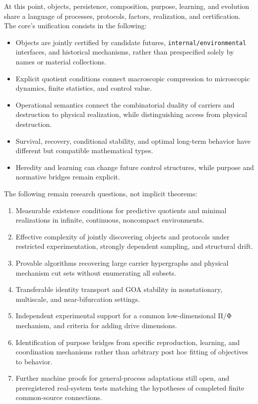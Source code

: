 \documentclass[
  english,
  11pt,
  oneside]{book}
\providecommand{\tightlist}{%
  \setlength{\itemsep}{0pt}\setlength{\parskip}{0pt}}
\begin{document}
At this point, objects, persistence, composition, purpose, learning, and evolution share a language of processes, protocols, factors, realization, and certification. The core's unification consists in the following:

\begin{itemize}
\tightlist
\item
  Objects are jointly certified by candidate futures, \nolinkurl{internal/environmental} interfaces, and historical mechanisms, rather than prespecified solely by names or material collections.
\item
  Explicit quotient conditions connect macroscopic compression to microscopic dynamics, finite statistics, and control value.
\item
  Operational semantics connect the combinatorial duality of carriers and destruction to physical realization, while distinguishing access from physical destruction.
\item
  Survival, recovery, conditional stability, and optimal long-term behavior have different but compatible mathematical types.
\item
  Heredity and learning can change future control structures, while purpose and normative bridges remain explicit.
\end{itemize}

The following remain research questions, not implicit theorems:

\begin{enumerate}
\def\labelenumi{\arabic{enumi}.}
\tightlist
\item
  Measurable existence conditions for predictive quotients and minimal realizations in infinite, continuous, noncompact environments.
\item
  Effective complexity of jointly discovering objects and protocols under restricted experimentation, strongly dependent sampling, and structural drift.
\item
  Provable algorithms recovering large carrier hypergraphs and physical mechanism cut sets without enumerating all subsets.
\item
  Transferable identity transport and GOA stability in nonstationary, multiscale, and near-bifurcation settings.
\item
  Independent experimental support for a common low-dimensional Π/Φ mechanism, and criteria for adding drive dimensions.
\item
  Identification of purpose bridges from specific reproduction, learning, and coordination mechanisms rather than arbitrary post hoc fitting of objectives to behavior.
\item
  Further machine proofs for general-process adaptations still open, and preregistered real-system tests matching the hypotheses of completed finite common-source connections.
\end{enumerate}
\end{document}
